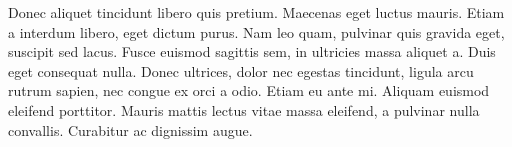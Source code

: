 Donec aliquet tincidunt libero quis pretium. Maecenas eget luctus mauris. Etiam a interdum libero, eget dictum purus. Nam leo quam, pulvinar quis gravida eget, suscipit sed lacus. Fusce euismod sagittis sem, in ultricies massa aliquet a. Duis eget consequat nulla. Donec ultrices, dolor nec egestas tincidunt, ligula arcu rutrum sapien, nec congue ex orci a odio. Etiam eu ante mi. Aliquam euismod eleifend porttitor. Mauris mattis lectus vitae massa eleifend, a pulvinar nulla convallis. Curabitur ac dignissim augue. 